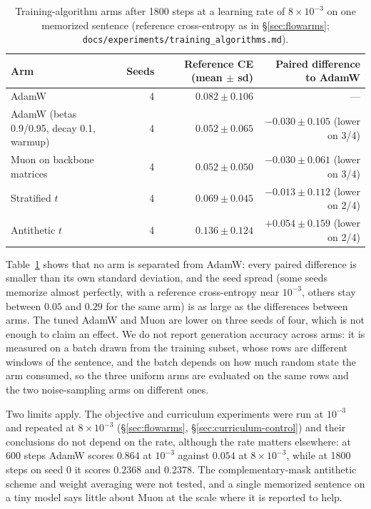 \documentclass[11pt]{article}
\begin{document}
\begin{table}[t]
\centering
\small
\begin{tabular}{lrrr}
\toprule
Arm & Seeds & Reference CE (mean $\pm$ sd) & Paired difference to AdamW \\
\midrule
AdamW & 4 & $0.082 \pm 0.106$ & --- \\
AdamW (betas 0.9/0.95, decay 0.1, warmup) & 4 & $0.052 \pm 0.065$ & $-0.030 \pm 0.105$ (lower on 3/4) \\
Muon on backbone matrices & 4 & $0.052 \pm 0.050$ & $-0.030 \pm 0.061$ (lower on 3/4) \\
Stratified $t$ & 4 & $0.069 \pm 0.045$ & $-0.013 \pm 0.112$ (lower on 2/4) \\
Antithetic $t$ & 4 & $0.136 \pm 0.124$ & $+0.054 \pm 0.159$ (lower on 2/4) \\
\bottomrule
\end{tabular}
\caption{Training-algorithm arms after 1800 steps at a learning rate of $8\times10^{-3}$ on one memorized sentence
(reference cross-entropy as in \S\ref{sec:flowarms}; \nolinkurl{docs/experiments/training_algorithms.md}).}
\label{tab:optarms}
\end{table}

Table~\ref{tab:optarms} shows that no arm is separated from AdamW: every paired difference is smaller than its own standard deviation, and the seed spread
(some seeds memorize almost perfectly, with a reference cross-entropy near $10^{-3}$, others stay between $0.05$ and
$0.29$ for the same arm) is as large as the differences between arms. The tuned AdamW and Muon are lower on three seeds
of four, which is not enough to claim an effect. We do not report generation accuracy across arms: it is measured on a
batch drawn from the training subset, whose rows are different windows of the sentence, and the batch depends on how much
random state the arm consumed, so the three uniform arms are evaluated on the same rows and the two noise-sampling arms
on different ones.

Two limits apply. The objective and curriculum experiments were run at $10^{-3}$ and repeated at $8\times10^{-3}$
(\S\ref{sec:flowarms}, \S\ref{sec:curriculum-control}) and their conclusions do not depend on the rate, although the rate matters
elsewhere: at 600 steps AdamW scores $0.864$ at $10^{-3}$ against $0.054$ at $8\times10^{-3}$, while at 1800 steps on seed 0
it scores $0.2368$ and $0.2378$. The complementary-mask antithetic scheme and weight averaging
were not tested, and a single memorized sentence on a tiny model says little about Muon at the scale where it is
reported to help.
\end{document}
